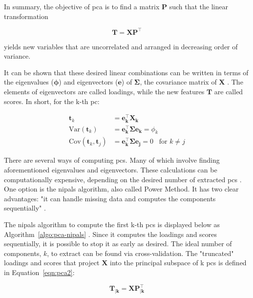 In summary, the objective of \acrshort{pca} is to find a matrix $\mathbf{P}$ such that the linear transformation

\begin{equation}
	\label{eqn:pca}
	\mathbf{T=XP^\intercal}
\end{equation}

yields new variables that are uncorrelated and arranged in decreasing order of variance.

It can be shown that these desired linear combinations can be written in terms of the eigenvalues ($\mathbf{\phi}$) and eigenvectors ($\mathbf{e}$) of $\mathbf{\Sigma}$, the covariance matrix of $\mathbf{X}$ \parencite{johnson2013applied}. The elements of eigenvectors are called loadings, while the new features $\mathbf{T}$ are called scores. In short, for the k-th \acrshort{pc}:

\begin{equation}
	\label{eqn:pca-eigen}
	\begin{split}
		\mathbf{t}_k & =\mathbf{e_k^\intercal X_k } \\
		\text{Var}(\mathbf{t}_k)& =  \mathbf{e_k^\intercal \Sigma e_k}=\phi_k \\
		\text{Cov}(\mathbf{t}_k, \mathbf{t}_j)& = \mathbf{e_k^\intercal \Sigma e_j}= 0 \;\;\; \text{for } k\neq j
	\end{split}
\end{equation}

There are several ways of computing \acrshort{pc}s. Many of which involve finding aforementioned eigenvalues and eigenvectors. These calculations can be computationally expensive, depending on the desired number of extracted \acrshort{pc}s \parencite{bishop2006pattern}. One option is the \acrfull{nipals} algorithm, also called Power Method. It has two clear advantages: "it can handle missing data and computes the components sequentially" \parencite{dunn2021pid}.

The \acrshort{nipals} algorithm to compute the first k-th \acrshort{pc}s is displayed below as Algorithm~\ref{algo:pca-nipals} \parencite{dunn2021pid} \parencite{ng2013} \parencite{nipals2017}. Since it computes the loadings and scores sequentially, it is possible to stop it as early as desired. The ideal number of components, $k$, to extract can be found via cross-validation. The "truncated" loadings and scores that project $\mathbf{X}$ into the principal subspace of k \acrshort{pc}s is defined in Equation~\ref{eqn:pca2}:

\begin{equation}
	\label{eqn:pca2}
	\mathbf{T_{|k}=XP_{|k}^\intercal}
\end{equation}

